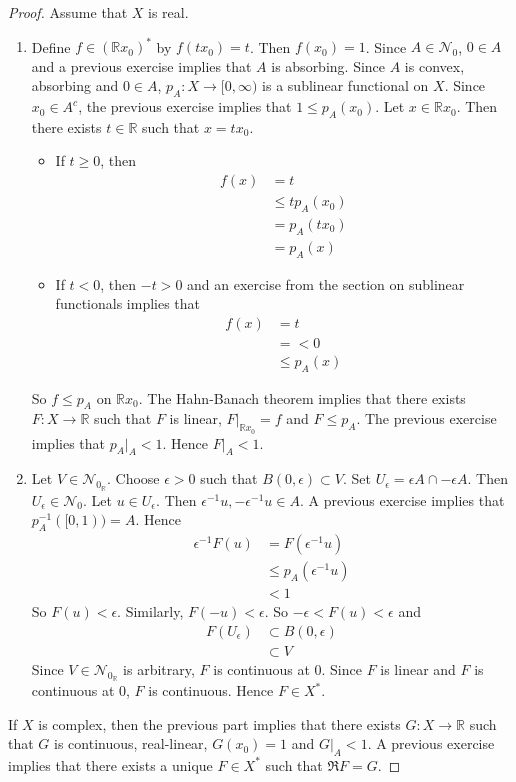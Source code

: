 \documentclass[12pt]{amsart}
\theoremstyle{definition}
\newcommand{\ep}{\epsilon}
\newcommand{\R}{\mathbb{R}}
\newcommand{\MN}{\mathcal{N}}
\DeclareMathOperator*{\0}{\mbf{0}}
\DeclareMathOperator*{\1}{\mbf{1}}
\begin{document}
	\begin{proof} Assume that $X$ is real.
		\begin{enumerate}
			\item Define $f \in (\R x_0)^*$ by $f(tx_0) = t$. Then $f(x_0) = 1$. Since $A \in \MN_0$, $0 \in A$ and a previous exercise implies that $A$ is absorbing. Since $A$ is convex, absorbing and $0 \in A$, $p_A:X \rightarrow [0, \infty)$ is a sublinear functional on $X$. Since $x_0 \in A^c$, the previous exercise implies that $1 \leq p_A(x_0)$. Let $x \in \R x_0$. Then there exists $t \in \R$ such that $x = tx_0$. 
			\begin{itemize}
				\item If $t \geq 0$, then 
				\begin{align*}
					f(x)
					&= t \\
					&\leq tp_A(x_0) \\
					&= p_A(tx_0) \\
					&= p_A(x)
				\end{align*}
				\item If $t<0$, then $-t >0$ and an exercise from the section on sublinear functionals implies that
				\begin{align*}
					f(x)
					&= t \\
					&= < 0 \\
					& \leq p_A(x)
				\end{align*}
			\end{itemize}
				So $f \leq p_A$ on $\R x_0$. The Hahn-Banach theorem implies that there exists $F:X \rightarrow \R$ such that $F$ is linear, $F|_{\R x_0} = f$ and $F \leq p_A$. The previous exercise implies that  $p_A|_A < 1$. Hence $F|_A < 1$. 
		\item Let $V \in \MN_{0_\R}$. Choose $\ep >0$ such that $B(0,\ep) \subset V$. Set $U_{\ep} = \ep A \cap -\ep A$. Then $U_{\ep} \in \MN_0$. Let $u \in U_{\ep}$. Then $\ep^{-1}u, -\ep^{-1}u \in A$. A previous exercise implies that $p_A^{-1}([0,1)) = A$. Hence 
		\begin{align*}
			\ep^{-1}F(u)
			&= F(\ep^{-1}u) \\
			&\leq p_A(\ep^{-1} u) \\
			&< 1
		\end{align*}
		So $F(u) < \ep$. Similarly, $F(-u) < \ep$. So $-\ep < F(u) < \ep$ and
		\begin{align*}
			F(U_{\ep}) 
			&\subset B(0, \ep) \\
			& \subset V 
		\end{align*}
		Since $V \in \MN_{0_{\R}}$ is arbitrary, $F$ is continuous at $0$. Since $F$ is linear and $F$ is continuous at $0$, $F$ is continuous. Hence $F \in X^*$.
		\end{enumerate}
	If $X$ is complex, then the previous part implies that there exists $G:X \rightarrow \R$ such that $G$ is continuous, real-linear, $G(x_0) = 1$ and $G|_A < 1$. A previous exercise implies that there exists a unique $F \in X^*$ such that $\Re F = G$.
	\end{proof}
\end{document}
